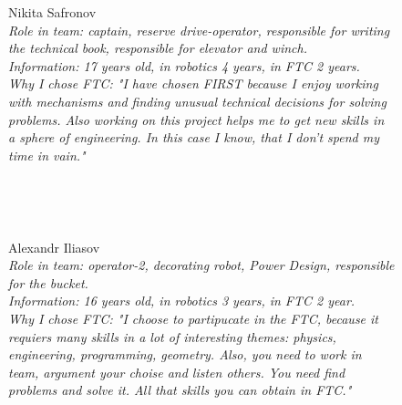 \begin{figure}[H]
	\begin{minipage}{0.47\linewidth}
		Nikita Safronov\\
		\emph{Role in team: captain, reserve drive-operator, responsible for writing the technical book, responsible for elevator and winch.\\}
		\emph{Information: 17 years old, in robotics 4 years, in FTC 2 years.\\} 
		\emph{Why I chose FTC: "I have chosen FIRST because I enjoy working with mechanisms and finding unusual technical decisions for solving problems. Also working on this project helps me to get new skills in a sphere of engineering. In this case I know, that I don't spend my time in vain."}				
	\end{minipage}
	\hfill
	\begin{minipage}{0.47\linewidth}
		\\
	\end{minipage}
\end{figure}

\begin{figure}[H]
	\begin{minipage}[h]{0.47\linewidth}
		\\
	\end{minipage}
	\hfill
	\begin{minipage}[h]{0.47\linewidth}
		Alexandr Iliasov \\
		\emph{Role in team: operator-2, decorating robot, Power Design, responsible for the bucket.\\}
		\emph{Information: 16 years old, in robotics 3 years, in FTC 2 year. \\}
		\emph{Why I chose FTC: "I choose to partipucate in the FTC, because it requiers many skills in a lot of interesting themes: physics, engineering, programming, geometry. Also, you need to work in team, argument your choise and listen others. You need find problems and solve it. All that skills you can obtain in FTC."}		
	\end{minipage}
	\vfill
\end{figure}

